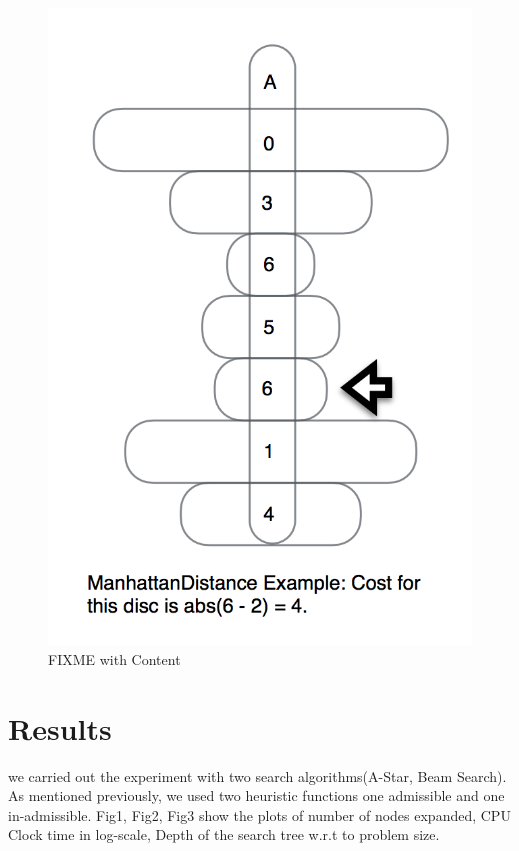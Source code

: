 \documentclass{article}
\begin{document}
\begin{figure}[h!]
\centering
\includegraphics[width=0.7\linewidth]{Diagram2.png}
\caption{FIXME with Content}
\label{fig:reflex}
\end{figure}

\section{Results}
 we carried out the experiment with two search algorithms(A-Star, Beam Search).  As mentioned previously, we used two heuristic functions one admissible and one in-admissible.  Fig1, Fig2, Fig3 show the plots of number of nodes expanded, CPU Clock time in log-scale, Depth of the search tree w.r.t to problem size. 
\end{document}

